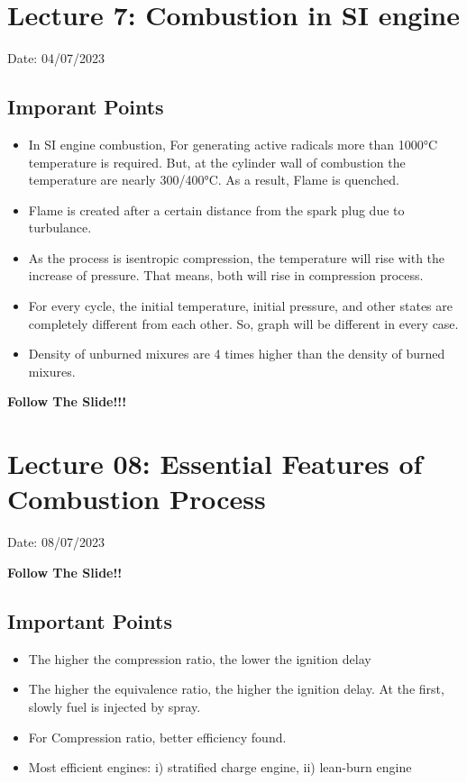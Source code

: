 \documentclass{article}
\begin{document}
\section{Lecture 7: Combustion in SI engine }
\hfill Date: 04/07/2023

\subsection*{Imporant Points}
\begin{itemize}
  \item In SI engine combustion, For generating active radicals more than 1000°C temperature is required. But, at the cylinder wall of combustion the temperature are nearly 300/400°C. As a result, Flame is quenched. 
  \item Flame is created after a certain distance from the spark plug due to turbulance. 
  \item As the process is isentropic compression, the temperature will rise with the increase of pressure. That means, both will rise in compression process. 
  \item For every cycle, the initial temperature, initial pressure, and other states are completely different from each other. So, graph will be different in every case. 
  \item Density of unburned mixures are 4 times higher than the density of burned mixures. 
\end{itemize}
\vspace*{1cm}
\textbf{Follow The Slide!!!} 

\vspace*{2cm}
\section{Lecture 08: Essential Features of Combustion Process} 
\hfill Date: 08/07/2023


\textbf{Follow The Slide!!}

\subsection*{Important Points}
\begin{itemize}
  \item The higher the compression ratio, the lower the ignition delay 
  \item The higher the equivalence ratio, the higher the ignition delay. At the first, slowly fuel is injected by spray. 
  \item For Compression ratio, better efficiency found.   
  \item Most efficient engines: i) stratified charge engine, ii) lean-burn engine 
\end{itemize}
\vspace*{1cm}
\end{document}
